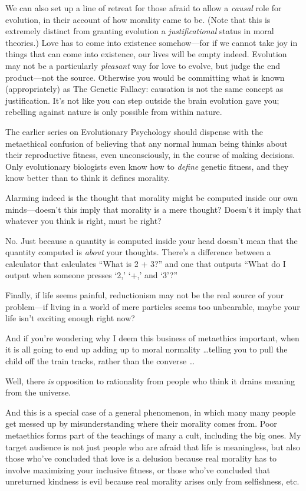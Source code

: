 {
 We can also set up a line of retreat for those afraid to allow a
\textit{causal} role for evolution, in their account of how morality
came to be. (Note that this is extremely distinct from granting
evolution a \textit{justificational} status in moral theories.) Love
has to come into existence somehow---for if we cannot take joy in
things that can come into existence, our lives will be empty indeed.
Evolution may not be a particularly \textit{pleasant} way for love to
evolve, but judge the end product---not the source. Otherwise you would
be committing what is known (appropriately) as The Genetic Fallacy:
causation is not the same concept as justification.
It's not like you can step outside the brain evolution
gave you; rebelling against nature is only possible from within
nature.}

{
 The earlier series on Evolutionary Psychology should dispense with
the metaethical confusion of believing that any normal human being
thinks about their reproductive fitness, even unconsciously, in the
course of making decisions. Only evolutionary biologists even know how
to \textit{define} genetic fitness, and they know better than to think
it defines morality.}

{
 Alarming indeed is the thought that morality might be computed
inside our own minds---doesn't this imply that morality
is a mere thought? Doesn't it imply that whatever you
think is right, must be right?}

{
 No. Just because a quantity is computed inside your head
doesn't mean that the quantity computed is
\textit{about} your thoughts. There's a difference
between a calculator that calculates ``What is 2 +
3?'' and one that outputs ``What do
I output when someone presses `2,'
`+,' and
`3'?''}

{
 Finally, if life seems painful, reductionism may not be the real
source of your problem---if living in a world of mere particles seems
too unbearable, maybe your life isn't exciting enough
right now?}

{
 And if you're wondering why I deem this business
of metaethics important, when it is all going to end up adding up to
moral normality \ldots telling you to pull the child off the train
tracks, rather than the converse \ldots}

{
 Well, there \textit{is} opposition to rationality from people who
think it drains meaning from the universe.}

{
 And this is a special case of a general phenomenon, in which many
many people get messed up by misunderstanding where their morality
comes from. Poor metaethics forms part of the teachings of many a cult,
including the big ones. My target audience is not just people who are
afraid that life is meaningless, but also those who've
concluded that love is a delusion because real morality has to involve
maximizing your inclusive fitness, or those who've
concluded that unreturned kindness is evil because real morality arises
only from selfishness, etc.}

